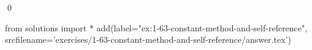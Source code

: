 
\begin{ex}
  \label{ex:1-63-constant-method-and-self-reference}
  
  \qed
\end{ex}
\begin{python0}
from solutions import *
add(label="ex:1-63-constant-method-and-self-reference",
    srcfilename='exercises/1-63-constant-method-and-self-reference/answer.tex')
\end{python0}
